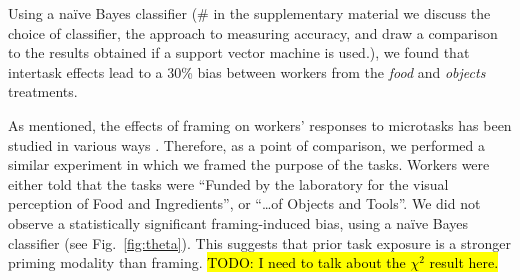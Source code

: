 \documentclass[12pt]{article}
\newcommand{\td}[1]{{\color{blu}\hl{TODO: #1}}}
\begin{document}
%
%
%
%
%
%
%
%

Using a na\"ive Bayes classifier (\# in the 
supplementary material we discuss the choice of classifier, the
approach to measuring accuracy, and draw a comparison to the results obtained 
if a support vector machine is used.), we found that intertask effects 
lead to a 30\% bias between workers from the \textit{food} and 
\textit{objects} treatments.

As mentioned, the effects of framing on workers' responses to microtasks has 
been studied in various ways 
\cite{Kinnaird2012281,chandler2013breaking,thibodeau2013natural}.
Therefore, as a point of comparison, we performed a similar experiment 
in which we framed the purpose of the tasks.  Workers were either told that 
the tasks were ``Funded by the laboratory for the visual perception of Food 
and Ingredients'', or ``\ldots of Objects and Tools''.  We did not observe a 
statistically significant framing-induced bias, using a na\"ive Bayes 
classifier (see Fig.~\ref{fig:theta}).  This suggests
that prior task exposure is a stronger priming modality than framing.
\td{I need to talk about the $\chi^2$ result here.}
\end{document}
